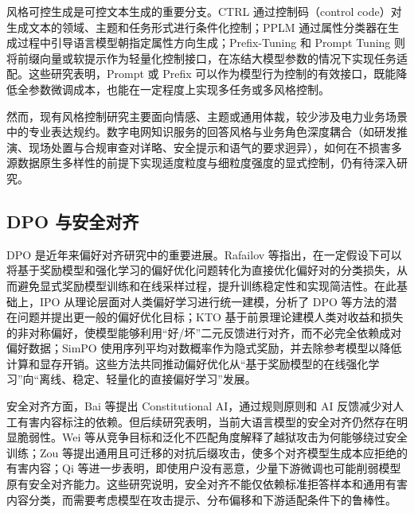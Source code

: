 \documentclass[fontset=fandol,type=master,campus=shenzhen,etitleauto=true]{hithesisbook}
\begin{document}
风格可控生成是可控文本生成的重要分支。CTRL 通过控制码（control code）对生成文本的领域、主题和任务形式进行条件化控制\cite{ref36}；PPLM 通过属性分类器在生成过程中引导语言模型朝指定属性方向生成\cite{ref37}；Prefix-Tuning 和 Prompt Tuning 则将前缀向量或软提示作为轻量化控制接口，在冻结大模型参数的情况下实现任务适配\cite{ref38,ref39}。这些研究表明，Prompt 或 Prefix 可以作为模型行为控制的有效接口，既能降低全参数微调成本，也能在一定程度上实现多任务或多风格控制。

然而，现有风格控制研究主要面向情感、主题或通用体裁，较少涉及电力业务场景中的专业表达规约。数字电网知识服务的回答风格与业务角色深度耦合（如研发推演、现场处置与合规审查对详略、安全提示和语气的要求迥异），如何在不损害多源数据原生多样性的前提下实现适度粒度与细粒度强度的显式控制，仍有待深入研究。

\subsection{DPO 与安全对齐}

DPO 是近年来偏好对齐研究中的重要进展。Rafailov 等指出，在一定假设下可以将基于奖励模型和强化学习的偏好优化问题转化为直接优化偏好对的分类损失，从而避免显式奖励模型训练和在线采样过程，提升训练稳定性和实现简洁性\cite{ref40}。在此基础上，IPO 从理论层面对人类偏好学习进行统一建模，分析了 DPO 等方法的潜在问题并提出更一般的偏好优化目标\cite{ref41}；KTO 基于前景理论建模人类对收益和损失的非对称偏好，使模型能够利用“好/坏”二元反馈进行对齐，而不必完全依赖成对偏好数据\cite{ref42}；SimPO 使用序列平均对数概率作为隐式奖励，并去除参考模型以降低计算和显存开销\cite{ref43}。这些方法共同推动偏好优化从“基于奖励模型的在线强化学习”向“离线、稳定、轻量化的直接偏好学习”发展。

安全对齐方面，Bai 等提出 Constitutional AI，通过规则原则和 AI 反馈减少对人工有害内容标注的依赖\cite{ref44}。但后续研究表明，当前大语言模型的安全对齐仍然存在明显脆弱性。Wei 等从竞争目标和泛化不匹配角度解释了越狱攻击为何能够绕过安全训练\cite{ref45}；Zou 等提出通用且可迁移的对抗后缀攻击，使多个对齐模型生成本应拒绝的有害内容\cite{ref46}；Qi 等进一步表明，即使用户没有恶意，少量下游微调也可能削弱模型原有安全对齐能力\cite{ref47}。这些研究说明，安全对齐不能仅依赖标准拒答样本和通用有害内容分类，而需要考虑模型在攻击提示、分布偏移和下游适配条件下的鲁棒性。
\end{document}
